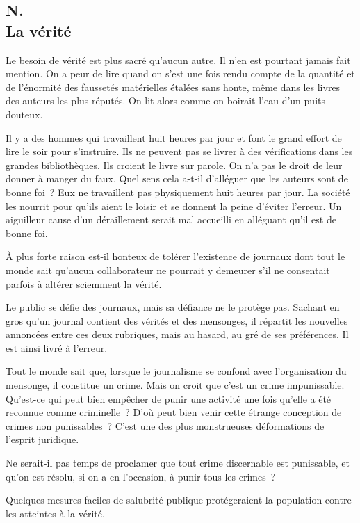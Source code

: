 \documentclass[french,twoside]{book} %
\begin{document}
\subsection[N. La vérité]{N. \\
La vérité}
\noindent \par
Le besoin de vérité est plus sacré qu'aucun autre. Il n'en est pourtant jamais fait mention. On a peur de lire quand on s'est une fois rendu compte de la quantité et de l'énormité des faussetés matérielles étalées sans honte, même dans les livres des auteurs les plus réputés. On lit alors comme on boirait l'eau d'un puits douteux.\par
Il y a des hommes qui travaillent huit heures par jour et font le grand effort de lire le soir pour s'instruire. Ils ne peuvent pas se livrer à des vérifications dans les grandes bibliothèques. Ils croient le livre sur parole. On n'a pas le droit de leur donner à manger du faux. Quel sens cela a-t-il d'alléguer que les auteurs sont de bonne foi ? Eux ne travaillent pas physiquement huit heures par jour. La société les nourrit pour qu'ils aient le loisir et se donnent la peine d'éviter l'erreur. Un aiguilleur cause d'un déraillement serait mal accueilli en alléguant qu'il est de bonne foi.\par
À plus forte raison est-il honteux de tolérer l'existence de journaux dont tout le monde sait qu'aucun collaborateur ne pourrait y demeurer s'il ne consentait parfois à altérer sciemment la vérité.\par
Le public se défie des journaux, mais sa défiance ne le protège pas. Sachant en gros qu'un journal contient des vérités et des mensonges, il répartit les nouvelles annoncées entre ces deux rubriques, mais au hasard, au gré de ses préférences. Il est ainsi livré à l'erreur.\par
Tout le monde sait que, lorsque le journalisme se confond avec l'organisation du mensonge, il constitue un crime. Mais on croit que c'est un crime impunissable. Qu'est-ce qui peut bien empêcher de punir une activité une fois qu'elle a été reconnue comme criminelle ? D'où peut bien venir cette étrange conception de crimes non punissables ? C'est une des plus monstrueuses déformations de l'esprit juridique.\par
Ne serait-il pas temps de proclamer que tout crime discernable est punissable, et qu'on est résolu, si on a en l'occasion, à punir tous les crimes ?\par
Quelques mesures faciles de salubrité publique protégeraient la population contre les atteintes à la vérité.\par
\end{document}
